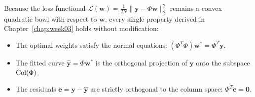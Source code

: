 Because the loss functional $\mathcal{L}(\mathbf{w}) = \frac{1}{2N}\|\mathbf{y} - \Phi \mathbf{w}\|_2^2$ remains a convex quadratic bowl with respect to $\mathbf{w}$, every single property derived in Chapter~\ref{chap:week03} holds without modification:
\begin{itemize}
    \item The optimal weights satisfy the normal equations: $(\Phi^T \Phi)\mathbf{w}^* = \Phi^T \mathbf{y}$.
    \item The fitted curve $\hat{\mathbf{y}} = \Phi \mathbf{w}^*$ is the orthogonal projection of $\mathbf{y}$ onto the subspace $\operatorname{Col}(\Phi)$.
    \item The residuals $\mathbf{e} = \mathbf{y} - \hat{\mathbf{y}}$ are strictly orthogonal to the column space: $\Phi^T \mathbf{e} = \mathbf{0}$.
\end{itemize}

